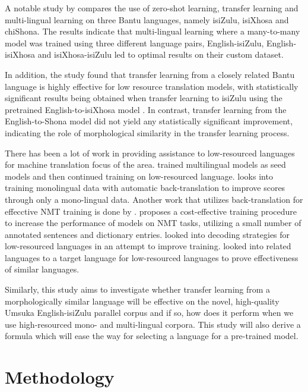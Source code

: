 \documentclass[11pt]{article}
\begin{document}
A notable study by \citet{nyoni2021low} compares the use of zero-shot learning, transfer learning and multi-lingual learning on three Bantu languages, namely isiZulu, isiXhosa and chiShona. The results indicate that multi-lingual learning where a many-to-many model was trained using three different language pairs, English-isiZulu, English-isiXhosa and isiXhosa-isiZulu led to optimal results on their custom dataset. 


In addition, the study found that transfer learning from a closely related Bantu language is highly effective for low resource translation models, with statistically significant results being obtained when transfer learning to isiZulu using the pretrained English-to-isiXhosa model \citep{nyoni2021low}. In contrast, transfer learning from the English-to-Shona model did not yield any statistically significant improvement, indicating the role of morphological similarity in the transfer learning process. 

There has been a lot of work in providing assistance to low-resourced languages for machine translation focus of the area. \citet{neubig2018rapid} trained multilingual models as seed models and then continued training on low-resourced language. \citet{sennrich2015improving} looks into training monolingual data with automatic back-translation \citep{edunov2018understanding,caswell2019tagged,edunov2019evaluation} to improve scores through only a mono-lingual data. Another work that utilizes back-translation for effecctive NMT training is done by \citet{dou2020dynamic}. \citet{koneru2022cost} proposes a cost-effective training procedure to increase the performance of models on NMT tasks, utilizing a small number of annotated sentences and dictionary entries. \citet{park2020decoding} looked into decoding strategies for low-resourced languages in an attempt to improve training. \citet{nguyen2017transfer} looked into related languages to a target language for low-resourced languages to prove effectiveness of similar languages.

Similarly, this study aims to investigate whether transfer learning from a morphologically similar language will be effective on the novel, high-quality Umsuka English-isiZulu parallel corpus and if so, how does it perform when we use high-resourced mono- and multi-lingual corpora. This study will also derive a formula which will ease the way for selecting a language for a pre-trained model.


\section{Methodology}
\end{document}

